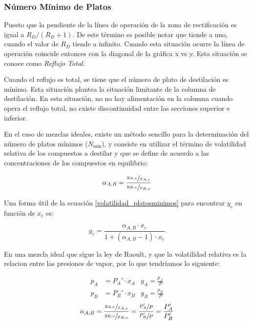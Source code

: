 \documentclass[11pt]{book}
\begin{document}
\subsubsection{Número Mínimo de Platos}

Puesto que la pendiente de la línea de operación de la zona de rectificación es igual a $R_D/(R_D+1)$. De este término es posible notar que tiende a uno, cuando el valor de $R_D$ tiende a infinito. Cuando esta situación ocurre la línea de operación coincide entonces con la diagonal de la gráfica x vs y. Esta situación se conoce como \textit{Reflujo Total}.

Cuando el reflujo es total, se tiene que el número de plato de destilación es mínimo. Esta situación plantea la situación limitante de la columna de destilación. En esta situación, no no hay alimentación en la columna cuando opera el reflujo total, no existe discontinuidad entre las secciones superior e inferior.

En el caso de mezclas ideales, existe un método sencillo para la determinación del número de platos mínimos ($N_{\textrm{min}}$), y consiste en utilizar el término de volatilidad relativa de los compuestos a destilar y que se define de acuerdo a las concentraciones de los compuestos en equilibrio:

\begin{equation}
    \label{volatilidad_platosminimos}
    \alpha_{A,B} = \frac{\sfrac{y_{A,e}}{x_{A,e}}}{\sfrac{y_{B,e}}{x_{B,e}}}
\end{equation}

Una forma útil de la ecuación \ref{volatilidad_platosminimos} para encontrar $y_e$ en función de $x_e$ es:

\begin{equation}
    y_e = \frac{\alpha_{A,B} \cdot x_e}{1+(\alpha_{A,B}-1)\cdot x_e}
\end{equation}

En una mezcla ideal que sigue la ley de Raoult, y que la volatilidad relativa es la relacion entre las presiones de vapor, por lo que tendríamos lo siguiente:

\begin{align*}
    p_A &= P_A'\cdot x_A & y_A = \frac{p_A}{P}
\end{align*}
\begin{align*}
    p_B &= P_B'\cdot x_B & y_B = \frac{p_B}{P}
\end{align*}
\begin{equation}
    \alpha_{A,B} = \frac{\sfrac{y_{A,e}}{x_{A,e}}}{\sfrac{y_{B,e}}{x_{B,e}}} = \frac{\sfrac{P_A'}{P}}{\sfrac{P_B'}{P}} = \frac{P_A'}{P_B'}
\end{equation}
\end{document}
